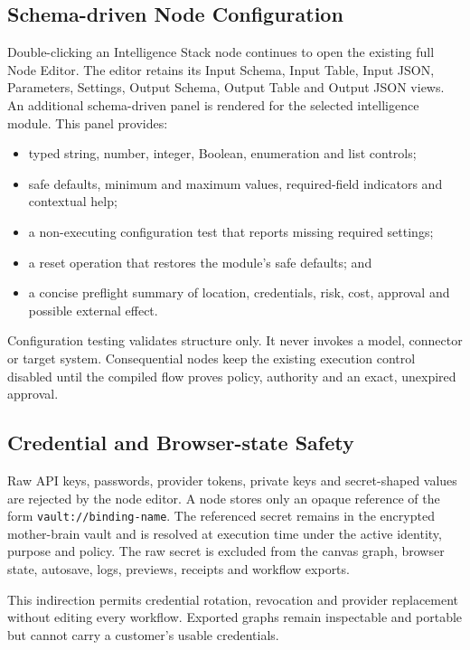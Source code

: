 \subsection{Schema-driven Node Configuration}

Double-clicking an Intelligence Stack node continues to open the existing full Node Editor.
The editor retains its Input Schema, Input Table, Input JSON, Parameters, Settings, Output
Schema, Output Table and Output JSON views.  An additional schema-driven panel is rendered for
the selected intelligence module.  This panel provides:

\begin{itemize}
  \item typed string, number, integer, Boolean, enumeration and list controls;
  \item safe defaults, minimum and maximum values, required-field indicators and contextual help;
  \item a non-executing configuration test that reports missing required settings;
  \item a reset operation that restores the module's safe defaults; and
  \item a concise preflight summary of location, credentials, risk, cost, approval and possible
  external effect.
\end{itemize}

Configuration testing validates structure only.  It never invokes a model, connector or target
system.  Consequential nodes keep the existing execution control disabled until the compiled
flow proves policy, authority and an exact, unexpired approval.

\subsection{Credential and Browser-state Safety}

Raw API keys, passwords, provider tokens, private keys and secret-shaped values are rejected by
the node editor.  A node stores only an opaque reference of the form
\texttt{vault://binding-name}.  The referenced secret remains in the encrypted mother-brain
vault and is resolved at execution time under the active identity, purpose and policy.  The raw
secret is excluded from the canvas graph, browser state, autosave, logs, previews, receipts and
workflow exports.

This indirection permits credential rotation, revocation and provider replacement without
editing every workflow.  Exported graphs remain inspectable and portable but cannot carry a
customer's usable credentials.

